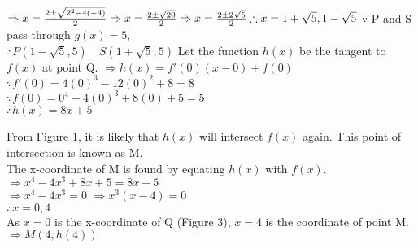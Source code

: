 \documentclass{homework}
\begin{document}
\begin{flushleft}
\begin{paracol}{2}
    $\Rightarrow x=\frac{2\pm \sqrt{2^2-4(-4)}}{2} 
    \Rightarrow x=\frac{2\pm \sqrt{20}}{2}
    \Rightarrow x=\frac{2\pm 2\sqrt{5}}{2} \vspace{0.7em}\linebreak 
    \therefore x=1+\sqrt{5}, 1-\sqrt{5} \space $
     \linebreak \linebreak
    $\because$ P and S pass through $g(x)=5,$ \\
    $\therefore P(1-\sqrt{5}, 5)  \hspace{1em}S(1+\sqrt{5}, 5)$ \linebreak\linebreak
    Let the function $h(x)$ be the tangent to $f(x)$ at point Q. \linebreak 
    $\Rightarrow h(x)=f'(0)(x-0)+f(0)$ \vspace{0.5em}\\ 
    \small{$\because f'(0)=4(0)^3-12(0)^2+8=8$} \vspace{0.5em}\\  
    \small{$\because f(0)=0^4-4(0)^3+8(0)+5=5$} \vspace{0.5em}\\ 
    \normalsize{$\therefore h(x)=8x+5$} \\ 
    \end{paracol} \newpage
    \begin{paracol}{2}
    \vspace{0.7em} From Figure 1, it is likely that $h(x)$ will intersect $f(x)$ again. 
    This point of intersection is known as M. \vspace{1em}\\
    The x-coordinate of M is found by equating $h(x)$ with $f(x)$. \vspace{0.7em}\\
    $\Rightarrow x^4-4x^3+8x+5=8x+5 $ \vspace{0.7em}\\ 
    $ \Rightarrow x^4-4x^3=0 $ \hspace{2em} 
    $ \Rightarrow x^3(x-4)=0  $ \vspace{0.7em}\\
    $ \therefore x=0, 4  $ \vspace{0.8em} \\
    As $x=0$ is the x-coordinate of Q (Figure 3), $x=4$ is the coordinate of point M. \vspace{0.8em} \\
    $\Rightarrow M(4, h(4)) $\vspace{0.7em}\\

\end{paracol}
\end{flushleft}
\end{document}
